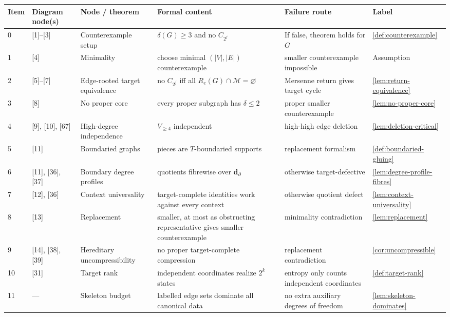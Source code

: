 \documentclass[11pt]{article}
\newcommand{\Mers}{\mathcal M}
\begin{document}
{\scriptsize\setlength{\tabcolsep}{2pt}
\begin{longtable}{C{0.04\textwidth} L{0.13\textwidth} L{0.17\textwidth} L{0.25\textwidth} L{0.21\textwidth} L{0.12\textwidth}}
\toprule
\textbf{Item} & \textbf{Diagram node(s)} & \textbf{Node / theorem} & \textbf{Formal content} & \textbf{Failure route} & \textbf{Label} \\
 & [1]--[3] & Counterexample setup & $\delta(G)\ge3$ and no $C_{2^j}$ & If false, theorem holds for $G$ & \cref{def:counterexample} \\
1 & [4] & Minimality & choose minimal $(|V|,|E|)$ counterexample & smaller counterexample impossible & Assumption \\
2 & [5]--[7] & Edge-rooted target equivalence & no $C_{2^j}$ iff all $R_e(G)\cap\Mers=\varnothing$ & Mersenne return gives target cycle & \cref{lem:return-equivalence} \\
3 & [8] & No proper core & every proper subgraph has $\delta\le2$ & proper smaller counterexample & \cref{lem:no-proper-core} \\
4 & [9], [10], [67] & High-degree independence & $V_{\ge4}$ independent & high-high edge deletion & \cref{lem:deletion-critical} \\
5 & [11] & Boundaried graphs & pieces are $T$-boundaried supports & replacement formalism & \cref{def:boundaried-gluing} \\
6 & [11], [36], [37] & Boundary degree profiles & quotients fibrewise over $\mathbf d_\partial$ & otherwise target-defective & \cref{lem:degree-profile-fibres} \\
7 & [12], [36] & Context universality & target-complete identities work against every context & otherwise quotient defect & \cref{lem:context-universality} \\
8 & [13] & Replacement & smaller, at most as obstructing representative gives smaller counterexample & minimality contradiction & \cref{lem:replacement} \\
9 & [14], [38], [39] & Hereditary uncompressibility & no proper target-complete compression & replacement contradiction & \cref{cor:uncompressible} \\
10 & [31] & Target rank & independent coordinates realize $2^k$ states & entropy only counts independent coordinates & \cref{def:target-rank} \\
11 & --- & Skeleton budget & labelled edge sets dominate all canonical data & no extra auxiliary degrees of freedom & \cref{lem:skeleton-dominates} \\

\end{longtable}}
\end{document}
